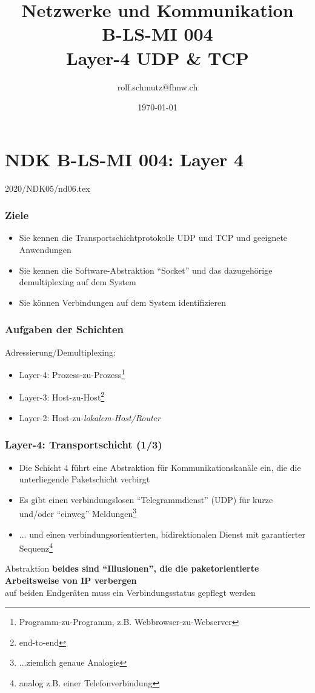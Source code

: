 \documentclass[ignorenonframetext]{beamer}
\date{\today}
\author{rolf.schmutz@fhnw.ch}
\institute{FHNW}
\title{Netzwerke und Kommunikation\\B-LS-MI 004\\Layer-4 UDP \& TCP}
\begin{document}

\section{NDK B-LS-MI 004: Layer 4}



\begin{frame}
\titlepage
\begin{center}\begin{tiny}2020/NDK05/nd06.tex\end{tiny}\end{center}

\end{frame}




\begin{frame}
\frametitle{Ziele}
\begin{itemize}
	\item{Sie kennen die Transportschichtprotokolle UDP und TCP und geeignete Anwendungen}
	\item{Sie kennen die Software-Abstraktion ``Socket'' und das dazugeh\"orige demultiplexing auf dem System}
	\item{Sie k\"onnen Verbindungen auf dem System identifizieren}
\end{itemize}
\end{frame}


\begin{frame}
\frametitle{Aufgaben der Schichten}
Adressierung/Demultiplexing:
\begin{itemize}
	\item Layer-4: Prozess-zu-Prozess\footnote{Programm-zu-Programm, z.B. Webbrowser-zu-Webserver}
	\item Layer-3: Host-zu-Host\footnote{end-to-end}
	\item Layer-2: Host-zu-\em{lokalem-Host/Router}
\end{itemize}
\end{frame}



\begin{frame}
\frametitle{Layer-4: Transportschicht (1/3)}
\begin{itemize}
	\item{Die Schicht 4 f\"uhrt eine Abstraktion f\"ur Kommunikationskan\"ale ein, die die unterliegende Paketschicht verbirgt}
	\item[1]{Es gibt einen verbindungslosen ``Telegrammdienst'' (UDP) f\"ur kurze und/oder ``einweg'' Meldungen\footnote{$\ldots$ziemlich genaue Analogie}}
	\item[2]{$\ldots$ und einen verbindungsorientierten, bidirektionalen Dienst mit garantierter Sequenz\footnote{analog z.B. einer Telefonverbindung}}
\end{itemize}
	\begin{block}{Abstraktion}
\textbf{beides sind ``Illusionen'', die die paketorientierte Arbeitsweise von IP verbergen}\\
auf beiden Endger\"aten muss ein Verbindungsstatus gepflegt werden
\end{block}
\end{frame}
\end{document}
